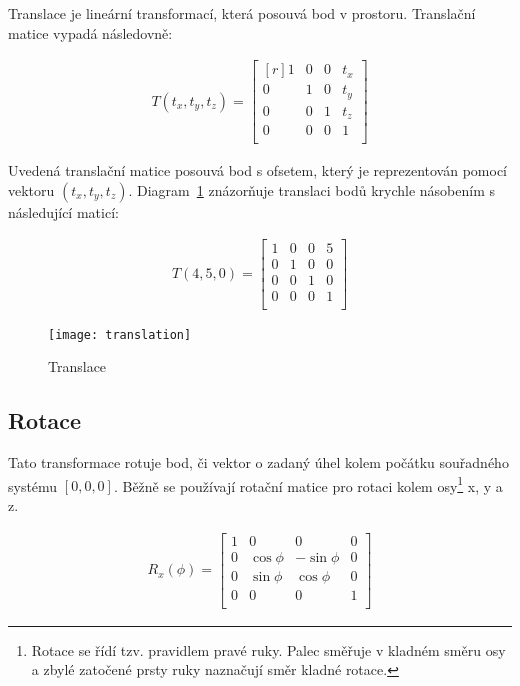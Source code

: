 \pagebreak
{}
Translace je lineární transformací, která posouvá bod v prostoru. Translační matice vypadá následovně:

\begin{align}
T(t_x, t_y, t_z) = 
\begin{bmatrix*}[r]
 1 & 0 & 0 & t_x \\
 0 & 1 & 0 & t_y \\
 0 & 0 & 1 & t_z \\
 0 & 0 & 0 & 1 \\
\end{bmatrix*}
\end{align}

Uvedená translační matice posouvá bod s ofsetem, který je reprezentován pomocí vektoru $(t_x, t_y, t_z)$. Diagram~\ref{fig:translation} znázorňuje translaci bodů krychle násobením s následující maticí:

\begin{align}
T(4, 5, 0) = 
\begin{bmatrix*}
1 & 0 & 0 & 5 \\
0 & 1 & 0 & 0 \\
0 & 0 & 1 & 0 \\
0 & 0 & 0 & 1 \\
\end{bmatrix*}
\end{align}

\begin{figure}[htb]
\centering
\texttt{[image: translation]}
\caption{Translace}
\label{fig:translation}
\end{figure}


\subsection*{Rotace}
Tato transformace rotuje bod, či vektor o zadaný úhel kolem počátku souřadného systému $[0, 0, 0]$. Běžně se používají rotační matice pro rotaci kolem osy\footnote{Rotace se řídí tzv. pravidlem pravé ruky. Palec směřuje v kladném směru osy a zbylé zatočené prsty ruky naznačují směr kladné rotace.} x, y a z. 

\begin{align}
R_x(\phi) = 
\begin{bmatrix*}
1 & 0 & 0 & 0 \\
0 & \cos\phi & -\sin\phi & 0 \\
0 & \sin\phi & \cos\phi & 0 \\
0 & 0 & 0 & 1 \\
\end{bmatrix*}
\end{align}

